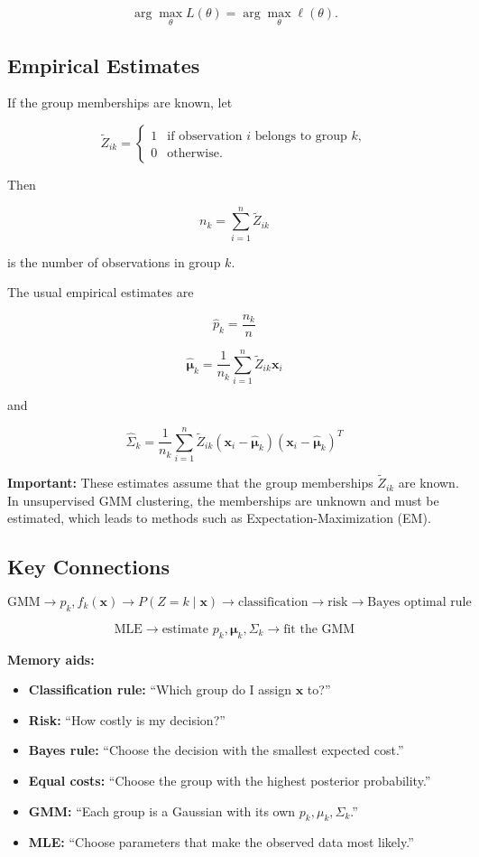 $$
\arg\max_\theta L(\theta)
=
\arg\max_\theta\ell(\theta).
$$

\subsection{Empirical Estimates}

If the group memberships are known, let

$$
\tilde Z_{ik}=
\begin{cases}
1 & \text{if observation }i\text{ belongs to group }k,\\
0 & \text{otherwise.}
\end{cases}
$$

Then

$$
n_k=\sum_{i=1}^n\tilde Z_{ik}
$$

is the number of observations in group $k$.

The usual empirical estimates are

$$
\boxed{
\hat p_k=\frac{n_k}{n}
}
$$

$$
\boxed{
\hat{\boldsymbol{\mu}}_k
=
\frac{1}{n_k}
\sum_{i=1}^n
\tilde Z_{ik}\mathbf{x}_i
}
$$

and

$$
\boxed{
\hat\Sigma_k
=
\frac{1}{n_k}
\sum_{i=1}^n
\tilde Z_{ik}
(\mathbf{x}_i-\hat{\boldsymbol{\mu}}_k)
(\mathbf{x}_i-\hat{\boldsymbol{\mu}}_k)^T
}
$$

\textbf{Important:} These estimates assume that the group memberships
$\tilde Z_{ik}$ are known. In unsupervised GMM clustering, the memberships
are unknown and must be estimated, which leads to methods such as
Expectation-Maximization (EM).

\subsection{Key Connections}

$$
\boxed{
\text{GMM}
\rightarrow
p_k,f_k(\mathbf{x})
\rightarrow
P(Z=k\mid\mathbf{x})
\rightarrow
\text{classification}
\rightarrow
\text{risk}
\rightarrow
\text{Bayes optimal rule}
}
$$

$$
\boxed{
\text{MLE}
\rightarrow
\text{estimate }p_k,\boldsymbol{\mu}_k,\Sigma_k
\rightarrow
\text{fit the GMM}
}
$$

\textbf{Memory aids:}
\begin{itemize}
\item \textbf{Classification rule:} ``Which group do I assign $\mathbf{x}$ to?''
    \item \textbf{Risk:} ``How costly is my decision?''
\item \textbf{Bayes rule:} ``Choose the decision with the smallest expected cost.''
    \item \textbf{Equal costs:} ``Choose the group with the highest posterior probability.''
\item \textbf{GMM:} ``Each group is a Gaussian with its own $p_k,\mu_k,\Sigma_k$.''
    \item \textbf{MLE:} ``Choose parameters that make the observed data most likely.''
\end{itemize}